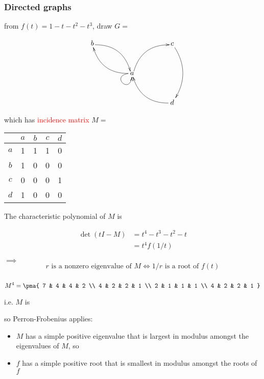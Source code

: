\documentclass{beamer}
\begin{document}
\begin{frame}
\frametitle{Directed graphs}

from $f(t) = 1-t-t^2-t^3$, draw $G = $

$$
\xymatrix@R=30pt@C=45pt{
b \ar@/^15pt/@<-0.5ex>[dr] & & c \ar@/^15pt/[dd] \\
& a \ar@/^15pt/[ul] \ar@/^15pt/@<-0.5ex>[ur] \ar@(l,d)[] \\
& & d \ar@/^15pt/[ul]
}
$$

\pause

which has \textcolor{red}{incidence matrix} $M = $
\begin{center}
\begin{tabular}{c|cccc}
& $a$ & $b$ & $c$ & $d$ \\
\hline
$a$ & 1 & 1 & 1 & 0 \\
$b$ & 1 & 0 & 0 & 0 \\
$c$ & 0 & 0 & 0 & 1 \\
$d$ & 1 & 0 & 0 & 0
\end{tabular}
\end{center}

\end{frame}

\begin{frame}

The characteristic polynomial of $M$ is

\begin{align*}
\det(tI - M) &= t^4 - t^3 - t^2 - t \\
&= t^4 f(1/t)
\end{align*}

\pause

\hfil

$\implies$
$$
r \text{ is a nonzero eigenvalue of } M \iff 1/r \text{ is a root of } f(t)
$$

\end{frame}

\begin{frame}
\frametitle{}
$$
M^4 = \pma{
7 & 4 & 4 & 2 \\
4 & 2 & 2 & 1 \\
2 & 1 & 1 & 1 \\
4 & 2 & 2 & 1
}
$$

i.e. $M$ is 

\pause

so Perron-Frobenius applies:
\begin{itemize}
\item $M$ has a simple positive eigenvalue that is largest in modulus amongst the eigenvalues of $M$, so
\item $f$ has a simple positive root that is smallest in modulus amongst the roots of $f$
\end{itemize}

\end{frame}
\end{document}
